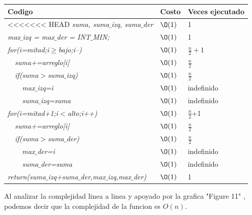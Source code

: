\documentclass[spanish]{article}
\begin{document}
	\begin{center}
		\begin{table}[H]
			\begin{tabular}{|l|l|l|}
				\hline
				\rowcolor[HTML]{FFCC67} 
				Codigo                           & Costo & Veces ejecutado \\ \hline
<<<<<<< HEAD
				\textit{suma, suma$\_$izq, suma$\_$der}                    & $\O(1)$    & 1               \\ \hline
				\textit{max$\_$izq = max$\_$der = INT$\_$MIN;}                    & $\O(1)$    & 1               \\ \hline								
				\textit{for(i=mitad;i$\geq$bajo;i--)} & $\O(1)$    & $\frac{n}{2}+1$             \\ \hline
				\textit{\  \  suma+=arreglo[i]}                 & $\O(1)$    & $\frac{n}{2}$               \\ \hline
				\textit{\  \  if(suma$>$suma$\_$izq)}                 & $\O(1)$    & $\frac{n}{2}$               \\ \hline
				\textit{\  \  \  \  max$\_$izq=i}                     & $\O(1)$    & indefinido              \\ \hline
				\textit{\  \  \  \  suma$\_$izq=suma}                     & $\O(1)$    & indefinido              \\ \hline				
				\textit{for(i=mitad+1;i$<$alto;i++)} & $\O(1)$    & $\frac{n}{2}$+1             \\ \hline
				\textit{\  \  suma+=arreglo[i]}                 & $\O(1)$    & $\frac{n}{2}$               \\ \hline
				\textit{\  \  if(suma$>$suma$\_$der)}                 & $\O(1)$    & $\frac{n}{2}$               \\ \hline
				\textit{\  \  \  \  max$\_$der=i}                     & $\O(1)$    & indefinido              \\ \hline
				\textit{\  \  \  \  suma$\_$der=suma}                     & $\O(1)$    & indefinido              \\ \hline			
				\textit{return(suma$\_$izq+suma$\_$der,max$\_$izq,max$\_$der)}                     & $\O(1)$    & 1              \\ \hline			
			\end{tabular}
		\end{table}										
	\end{center}			
	Al analizar la complejidad linea a linea y apoyado por la grafica "Figure 11" , podemos decir que la complejidad de la funcion es $O(n)$.
\end{document}
